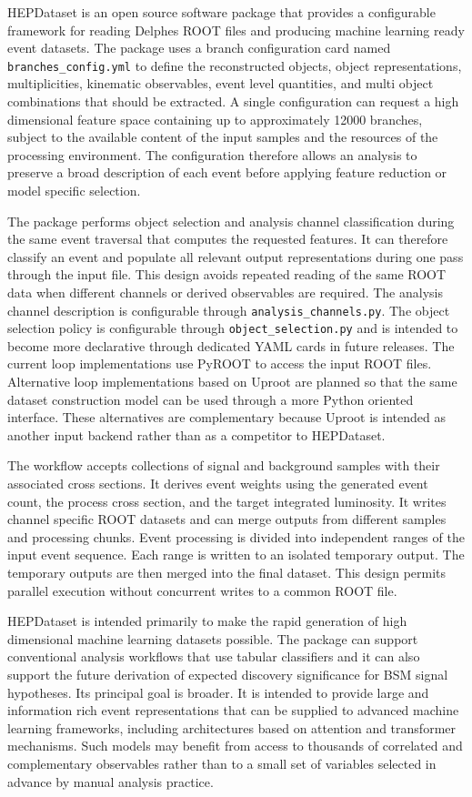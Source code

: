 \documentclass[11pt,a4paper]{article}
\begin{document}
HEPDataset is an open source software package that provides a configurable
framework for reading Delphes ROOT files and producing machine learning
ready event datasets. The package uses a branch configuration card named
\texttt{branches\_config.yml} to define the reconstructed objects, object
representations, multiplicities, kinematic observables, event level quantities,
and multi object combinations that should be extracted. A single configuration
can request a high dimensional feature space containing up to approximately
12000 branches, subject to the available content of the input samples and the
resources of the processing environment. The configuration therefore allows an
analysis to preserve a broad description of each event before applying feature
reduction or model specific selection.

The package performs object selection and analysis channel classification
during the same event traversal that computes the requested features. It can
therefore classify an event and populate all relevant output representations
during one pass through the input file. This design avoids repeated reading of
the same ROOT data when different channels or derived observables are required.
The analysis channel description is configurable through
\texttt{analysis\_channels.py}. The object selection policy is configurable
through \texttt{object\_selection.py} and is intended to become more declarative
through dedicated YAML cards in future releases. The current loop
implementations use PyROOT to access the input ROOT files. Alternative loop
implementations based on Uproot are planned so that the same dataset
construction model can be used through a more Python oriented interface. These
alternatives are complementary because Uproot is intended as another input
backend rather than as a competitor to HEPDataset.

The workflow accepts collections of signal and background samples with their
associated cross sections. It derives event weights using the generated event
count, the process cross section, and the target integrated luminosity. It
writes channel specific ROOT datasets and can merge outputs from different
samples and processing chunks. Event processing is divided into independent
ranges of the input event sequence. Each range is written to an isolated
temporary output. The temporary outputs are then merged into the final dataset.
This design permits parallel execution without concurrent writes to a common
ROOT file.

HEPDataset is intended primarily to make the rapid generation of high
dimensional machine learning datasets possible. The package can support
conventional analysis workflows that use tabular classifiers and it can also
support the future derivation of expected discovery significance for BSM signal
hypotheses. Its principal goal is broader. It is intended to provide large and
information rich event representations that can be supplied to advanced machine
learning frameworks, including architectures based on attention and transformer
mechanisms. Such models may benefit from access to thousands of correlated and
complementary observables rather than to a small set of variables selected in
advance by manual analysis practice.
\end{document}
